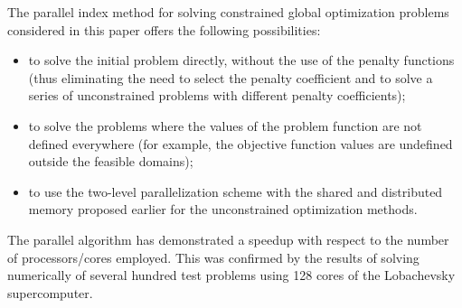 \documentclass[smallextended]{svjour3}       %
\begin{document}
The parallel index method for solving constrained global optimization problems considered in this paper offers the following possibilities:
\begin{itemize}
	\item to solve the initial problem directly, without the use of the penalty functions (thus eliminating the need to select the penalty coefficient and to solve a series of unconstrained problems with different penalty coefficients);
	\item to solve the problems where the values of the problem function are not defined everywhere (for example, the objective function values are undefined outside the feasible domains);
	\item to use the two-level parallelization scheme with the shared and distributed memory proposed earlier for the unconstrained optimization methods.
\end{itemize}

The parallel algorithm has demonstrated a speedup with respect to the number of processors/cores employed. This was confirmed by the results of solving numerically of several hundred test problems using 128 cores of the Lobachevsky supercomputer. 
\end{document}
